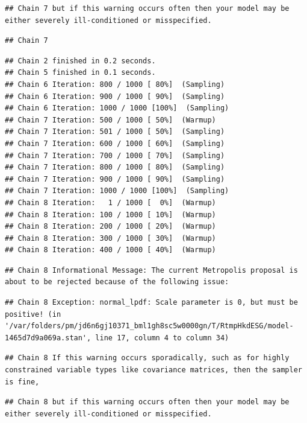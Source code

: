 \documentclass[
]{article}
\begin{document}
\begin{verbatim}
## Chain 7 but if this warning occurs often then your model may be either severely ill-conditioned or misspecified.
\end{verbatim}

\begin{verbatim}
## Chain 7
\end{verbatim}

\begin{verbatim}
## Chain 2 finished in 0.2 seconds.
## Chain 5 finished in 0.1 seconds.
## Chain 6 Iteration: 800 / 1000 [ 80%]  (Sampling) 
## Chain 6 Iteration: 900 / 1000 [ 90%]  (Sampling) 
## Chain 6 Iteration: 1000 / 1000 [100%]  (Sampling) 
## Chain 7 Iteration: 500 / 1000 [ 50%]  (Warmup) 
## Chain 7 Iteration: 501 / 1000 [ 50%]  (Sampling) 
## Chain 7 Iteration: 600 / 1000 [ 60%]  (Sampling) 
## Chain 7 Iteration: 700 / 1000 [ 70%]  (Sampling) 
## Chain 7 Iteration: 800 / 1000 [ 80%]  (Sampling) 
## Chain 7 Iteration: 900 / 1000 [ 90%]  (Sampling) 
## Chain 7 Iteration: 1000 / 1000 [100%]  (Sampling) 
## Chain 8 Iteration:   1 / 1000 [  0%]  (Warmup) 
## Chain 8 Iteration: 100 / 1000 [ 10%]  (Warmup) 
## Chain 8 Iteration: 200 / 1000 [ 20%]  (Warmup) 
## Chain 8 Iteration: 300 / 1000 [ 30%]  (Warmup) 
## Chain 8 Iteration: 400 / 1000 [ 40%]  (Warmup)
\end{verbatim}

\begin{verbatim}
## Chain 8 Informational Message: The current Metropolis proposal is about to be rejected because of the following issue:
\end{verbatim}

\begin{verbatim}
## Chain 8 Exception: normal_lpdf: Scale parameter is 0, but must be positive! (in '/var/folders/pm/jd6n6gj10371_bml1gh8sc5w0000gn/T/RtmpHkdESG/model-1465d7d9a069a.stan', line 17, column 4 to column 34)
\end{verbatim}

\begin{verbatim}
## Chain 8 If this warning occurs sporadically, such as for highly constrained variable types like covariance matrices, then the sampler is fine,
\end{verbatim}

\begin{verbatim}
## Chain 8 but if this warning occurs often then your model may be either severely ill-conditioned or misspecified.
\end{verbatim}
\end{document}
